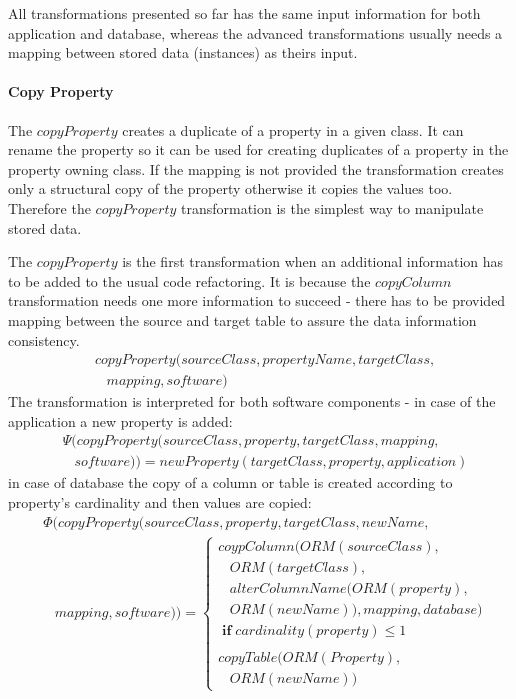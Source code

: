 \documentclass[runningheads]{comsis}
\begin{document}
All transformations presented so far has the same input information for both application and database, whereas the advanced transformations usually needs a mapping between stored data (instances) as theirs input. 

\paragraph{Copy Property}
The $copyProperty$ creates a duplicate of a property in a given class. It can rename the property so it can be used for creating duplicates of a property in the property owning class. If the mapping is not provided the transformation creates only a structural copy of the property otherwise it copies the values too. Therefore the  $copyProperty$ transformation is the simplest way to manipulate stored data.

The  $copyProperty$ is the first transformation when an additional information has to be added to the usual code refactoring. It is because the $copyColumn$ transformation needs one more information to succeed - there has to be provided mapping between the source and target table to assure the data information consistency. %
\begin{align}
& copyProperty(sourceClass, propertyName, targetClass, \nonumber  \\
& \; \; \; mapping, software) 
\end{align}
The transformation is interpreted for both software components - in case of the application a new property is added:
\begin{align}
& \Psi(copyProperty(sourceClass, property, targetClass, mapping, \nonumber  \\ 
&  \; \; \; software)) = newProperty(targetClass, property, application) 
\end{align}
in case of database the copy of a column or table is created according to property's cardinality and then values are copied:
\begin{align}
& \Phi(copyProperty(sourceClass, property, targetClass, newName, \nonumber \\ 
&  \; \; \; mapping, software)) = \begin{cases}
 coypColumn(ORM(sourceClass),  \\ \;\;\; ORM(targetClass),  \\ \;\;\;alterColumnName(ORM(property), \\ \;\;\; ORM(newName)), mapping, database) \\ \; \mathbf{if} \; cardinality(property) \leq 1 \\\\
 copyTable(ORM(Property), \\ \;\;\; ORM(newName))
 \end{cases}
\end{align}
\end{document}
